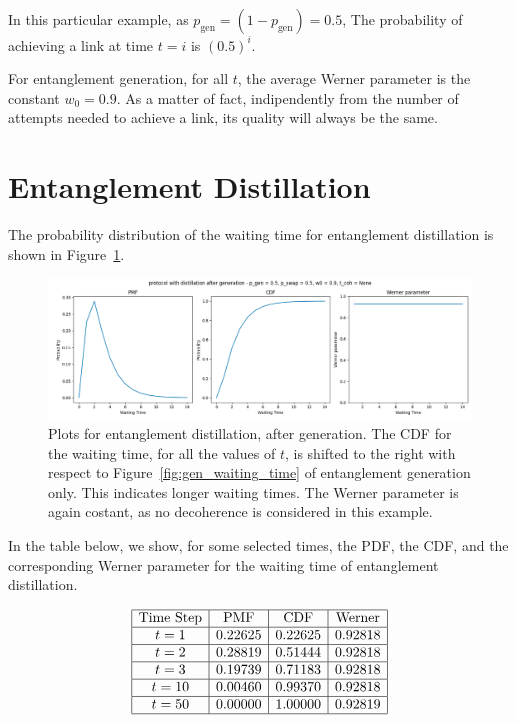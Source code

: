 \documentclass{masterthesis}
\begin{document}
In this particular example, as $p_\text{gen} = (1 - p_\text{gen}) = 0.5$, The probability of achieving a link at time $t = i$ is $(0.5)^i$.

For entanglement generation, for all $t$, the average Werner parameter is the constant $w_0 = 0.9$. As a matter of fact, indipendently from the number of attempts needed to achieve a link, its quality will always be the same.

\section{Entanglement Distillation}

The probability distribution of the waiting time for entanglement distillation is shown in Figure~\ref{fig:dist_waiting_time}.

\begin{figure}[ht]
    \centering
    \includegraphics[width=1\linewidth]{images/dist_tests/distillation after generation.png}
    \caption{Plots for entanglement distillation, after generation. The CDF for the waiting time, for all the values of $t$, is shifted to the right with respect to Figure~\ref{fig:gen_waiting_time} of entanglement generation only. This indicates longer waiting times. The Werner parameter is again costant, as no decoherence is considered in this example.}
    \label{fig:dist_waiting_time}
\end{figure}

In the table below, we show, for some selected times, the PDF, the CDF, and the corresponding Werner parameter for the waiting time of entanglement distillation.

\begin{equation*}
    \begin{array}{|c|c|c|c|}
        \hline
        \text{Time Step} & \text{PMF} & \text{CDF} & \text{Werner} \\
        \hline
        t = 1 & 0.22625 & 0.22625 & 0.92818 \\
        \hline
        t = 2 & 0.28819 & 0.51444 & 0.92818 \\
        \hline
        t = 3 & 0.19739 & 0.71183 & 0.92818 \\
        \hline
        t = 10 & 0.00460 & 0.99370 & 0.92818 \\
        \hline
        t = 50 & 0.00000 & 1.00000 & 0.92819 \\
        \hline
    \end{array}
\end{equation*}
\end{document}
